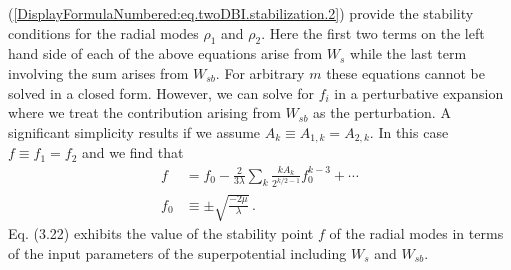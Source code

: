 \documentclass[a4paper,11pt]{article}
\begin{document}
  (\ref{DisplayFormulaNumbered:eq.twoDBI.stabilization.2})
  provide the stability conditions  for the radial modes $\rho_1$ and $\rho_2$.
  Here the first two terms on the left hand side of each of the above equations arise from $W_s$ while the last term involving
  the sum arises from $W_{sb}$. 
  For arbitrary $m$ these equations cannot be solved in a closed form. However, we can solve for $f_i$ in a perturbative
  expansion where we treat the contribution arising from $W_{sb}$ as the perturbation. A significant simplicity results if we
  assume $A_k\equiv A_{1,k}=A_{2,k}$. In this case $f\equiv f_1=f_2$ and   we find that 
    \begin{align} \label{eq.f.series}
  f&= f_0 - \frac{2}{3\lambda} \sum_{k} \frac{kA_k}{2^{k/2-1} } f_0^{k-3} + \cdots  \nonumber\\
  f_0&\equiv \pm \sqrt{\frac{-2\mu}{\lambda}}\,.
  \end{align}
  Eq. (3.22) exhibits the value of the stability point  $f$ of the radial modes in terms of the input parameters of the superpotential
  including $W_s$ and $W_{sb}$. 
\end{document}
